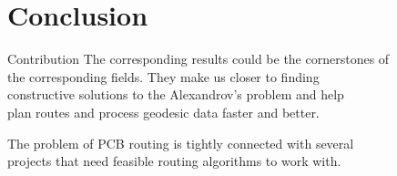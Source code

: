 \documentclass[12pt,aspectratio=169,svgnames]{beamer}
\begin{document}
\section{Conclusion}

\begin{frame}{Contribution}
	The corresponding results could be the cornerstones of \\
	the corresponding fields. They make us closer to finding \\
	constructive solutions to the Alexandrov's problem and help \\
	plan routes and process geodesic data faster and better. \bigskip

	The problem of PCB routing is tightly connected with several \\
	projects that need feasible routing algorithms to work with.
\end{frame}
\end{document}
